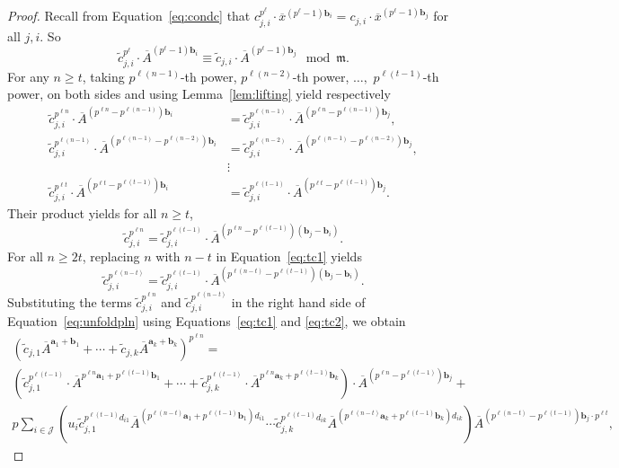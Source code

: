 \documentclass[10pt,a4paper]{amsart}
\newcommand{\ba}{\boldsymbol{a}}
\newcommand{\bb}{\boldsymbol{b}}
\newcommand{\frm}{\mathfrak{m}}
\newcommand{\mJ}{\mathcal{J}}
\newcommand{\oA}{\overline{A}}
\newcommand{\ox}{\overline{x}}
\newcommand{\tc}{\widetilde{c}}
\begin{document}
\begin{proof}
    Recall from Equation~\eqref{eq:condc} that $c_{j,i}^{p^{\ell}} \cdot \ox^{(p^{\ell} - 1) \bb_i} = c_{j,i} \cdot \ox^{(p^{\ell}-1)\bb_j}$ for all $j, i$.
    So
    \[
    \tc_{j,i}^{p^{\ell}} \cdot \oA^{(p^{\ell} - 1) \bb_i} \equiv \tc_{j,i} \cdot \oA^{(p^{\ell}-1)\bb_j} \mod \frm.
    \]
    For any $n \geq t$, taking $p^{\ell (n-1)}$-th power, $p^{\ell (n-2)}$-th power, $\ldots,$ $p^{\ell (t-1)}$-th power, on both sides and using Lemma~\ref{lem:lifting} yield respectively
    \begin{align*}
    \tc_{j,i}^{p^{\ell n}} \cdot \oA^{(p^{\ell n} - p^{\ell (n-1)}) \bb_i} & = \tc_{j,i}^{p^{\ell (n-1)}} \cdot \oA^{(p^{\ell n} - p^{\ell (n-1)})\bb_j}, \\
    \tc_{j,i}^{p^{\ell (n-1)}} \cdot \oA^{(p^{\ell (n-1)} - p^{\ell (n-2)}) \bb_i} & = \tc_{j,i}^{p^{\ell (n-2)}} \cdot \oA^{(p^{\ell (n-1)} - p^{\ell (n-2)})\bb_j}, \\
    & \vdots \\
    \tc_{j,i}^{p^{\ell t}} \cdot \oA^{(p^{\ell t} - p^{\ell (t-1)}) \bb_i} & = \tc_{j,i}^{p^{\ell (t-1)}} \cdot \oA^{(p^{\ell t} - p^{\ell (t-1)})\bb_j}.
    \end{align*}
    Their product yields for all $n \geq t$,
    \begin{equation}\label{eq:tc1}
    \tc_{j,i}^{p^{\ell n}} = \tc_{j,i}^{p^{\ell (t-1)}} \cdot \oA^{(p^{\ell n} - p^{\ell (t-1)})(\bb_j - \bb_i)}.
    \end{equation}
    For all $n \geq 2t$, replacing $n$ with $n-t$ in Equation~\eqref{eq:tc1} yields
    \begin{equation}\label{eq:tc2}
    \tc_{j,i}^{p^{\ell (n-t)}} = \tc_{j,i}^{p^{\ell (t-1)}} \cdot \oA^{(p^{\ell (n-t)} - p^{\ell (t-1)})(\bb_j - \bb_i)}.
    \end{equation}
    Substituting the terms $\tc_{j,i}^{p^{\ell n}}$ and $\tc_{j,i}^{p^{\ell (n-t)}}$ in the right hand side of Equation~\eqref{eq:unfoldpln} using Equations~\eqref{eq:tc1} and \eqref{eq:tc2}, we obtain
    \begin{multline}\label{eq:sub1}
        \left(\tc_{j,1} \oA^{\ba_1 + \bb_1} + \cdots + \tc_{j,k} \oA^{\ba_k + \bb_k}\right)^{p^{\ell n}} = \\
        \left(\tc_{j,1}^{p^{\ell (t-1)}} \cdot \oA^{p^{\ell n}\ba_1 + p^{\ell (t-1)} \bb_1} + \cdots + \tc_{j,k}^{p^{\ell (t-1)}} \cdot \oA^{p^{\ell n}\ba_k + p^{\ell (t-1)} \bb_k} \right) \cdot \oA^{(p^{\ell n} - p^{\ell (t-1)}) \bb_j} + \\
        p \sum_{i \in \mJ} \left( u_{i} \tc_{j,1}^{p^{\ell (t-1)}d_{i1}} \oA^{\left(p^{\ell (n-t)}\ba_1 + p^{\ell (t-1)} \bb_1  \right)d_{i1}} \cdots \tc_{j,k}^{p^{\ell (t-1)} d_{ik}} \oA^{\left(p^{\ell (n-t)}\ba_k + p^{\ell (t-1)} \bb_k \right) d_{ik} } \right) \oA^{(p^{\ell (n-t)} - p^{\ell (t-1)}) \bb_j \cdot p^{\ell t}},

\end{multline}
\end{proof}
\end{document}
